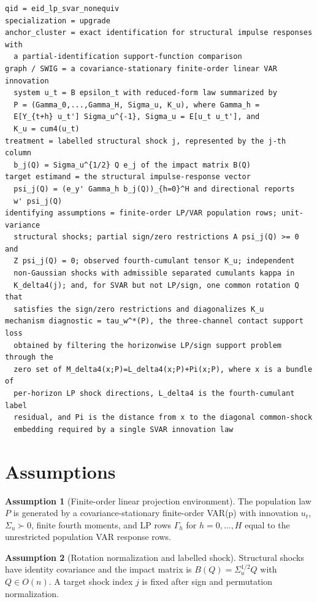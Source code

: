 \documentclass[11pt]{article}
\theoremstyle{definition}
\newtheorem{assumption}{Assumption}
\theoremstyle{plain}
\theoremstyle{remark}
\begin{document}
\begin{verbatim}
qid = eid_lp_svar_nonequiv
specialization = upgrade
anchor_cluster = exact identification for structural impulse responses with
  a partial-identification support-function comparison
graph / SWIG = a covariance-stationary finite-order linear VAR innovation
  system u_t = B epsilon_t with reduced-form law summarized by
  P = (Gamma_0,...,Gamma_H, Sigma_u, K_u), where Gamma_h =
  E[Y_{t+h} u_t'] Sigma_u^{-1}, Sigma_u = E[u_t u_t'], and
  K_u = cum4(u_t)
treatment = labelled structural shock j, represented by the j-th column
  b_j(Q) = Sigma_u^{1/2} Q e_j of the impact matrix B(Q)
target estimand = the structural impulse-response vector
  psi_j(Q) = (e_y' Gamma_h b_j(Q))_{h=0}^H and directional reports
  w' psi_j(Q)
identifying assumptions = finite-order LP/VAR population rows; unit-variance
  structural shocks; partial sign/zero restrictions A psi_j(Q) >= 0 and
  Z psi_j(Q) = 0; observed fourth-cumulant tensor K_u; independent
  non-Gaussian shocks with admissible separated cumulants kappa in
  K_delta4(j); and, for SVAR but not LP/sign, one common rotation Q that
  satisfies the sign/zero restrictions and diagonalizes K_u
mechanism diagnostic = tau_w^*(P), the three-channel contact support loss
  obtained by filtering the horizonwise LP/sign support problem through the
  zero set of M_delta4(x;P)=L_delta4(x;P)+Pi(x;P), where x is a bundle of
  per-horizon LP shock directions, L_delta4 is the fourth-cumulant label
  residual, and Pi is the distance from x to the diagonal common-shock
  embedding required by a single SVAR innovation law
\end{verbatim}

\section{Assumptions}
\begin{assumption}[Finite-order linear projection environment]\label{ass:finite-var}
The population law \(P\) is generated by a covariance-stationary finite-order VAR(p) with innovation \(u_t\), \(\Sigma_u\succ0\), finite fourth moments, and LP rows \(\Gamma_h\) for \(h=0,\ldots,H\) equal to the unrestricted population VAR response rows.
\end{assumption}

\begin{assumption}[Rotation normalization and labelled shock]\label{ass:normalization}
Structural shocks have identity covariance and the impact matrix is \(B(Q)=\Sigma_u^{1/2}Q\) with \(Q\in O(n)\).  A target shock index \(j\) is fixed after sign and permutation normalization.
\end{assumption}
\end{document}
